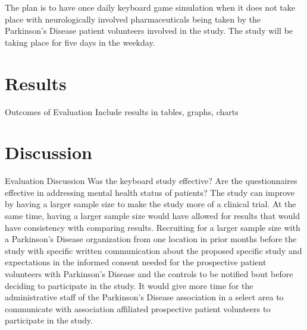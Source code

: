 \documentclass[12pt,letterpaper]{article}
\begin{document}
 The plan is to have once daily keyboard game simulation when it does not take place with neurologically involved pharmaceuticals being taken by the Parkinson's Disease patient volunteers involved in the study. The study will be taking place for five days in the weekday. 
 
\section{Results}
 Outcomes of Evaluation	
 Include results in tables, graphs, charts
 
\section{Discussion}
 Evaluation Discussion
 Was the keyboard study effective?
 Are the questionnaires effective in addressing mental health status of patients?
 The study can improve by having a larger sample size to make the study more of a clinical trial. At the same time, having a larger sample size would have allowed for results that would have consistency with comparing results. Recruiting for a larger sample size with a Parkinson's Disease organization from one location in prior months before the study with specific written communication about the proposed specific study and expectations in the informed consent needed for the prospective patient volunteers with Parkinson's Disease and the controls to be notified bout before deciding to participate in the study. It would give more time for the administrative staff of the Parkinson's Disease association in a select area to communicate with association affiliated prospective patient volunteers to participate in the study. 

\nocite{*}


\end{document}
